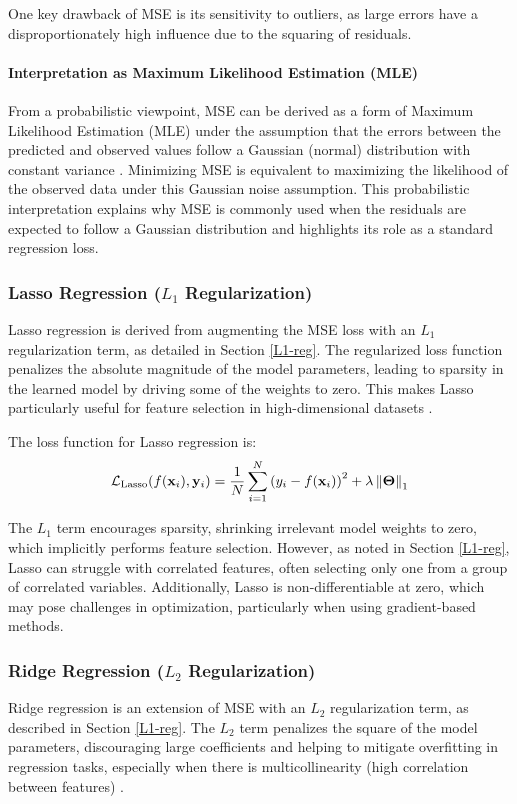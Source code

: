 \documentclass[sn-mathphys-num]{sn-jnl}%
\renewcommand\vec{\mathbf}
\begin{document}
    One key drawback of MSE is its sensitivity to outliers, as large errors have a disproportionately high influence due to the squaring of residuals.

    \paragraph{Interpretation as Maximum Likelihood Estimation (MLE)}
    From a probabilistic viewpoint, MSE can be derived as a form of Maximum Likelihood Estimation (MLE) under the assumption that the errors between the predicted and observed values follow a Gaussian (normal) distribution with constant variance \cite{ML_3,murphy2013machine}. Minimizing MSE is equivalent to maximizing the likelihood of the observed data under this Gaussian noise assumption. This probabilistic interpretation explains why MSE is commonly used when the residuals are expected to follow a Gaussian distribution and highlights its role as a standard regression loss.


    \subsubsection{Lasso Regression ($L_1$ Regularization)}\label{subsubsec-lasso_regression}
Lasso regression is derived from augmenting the MSE loss with an $L_1$ regularization term, as detailed in Section \ref{L1-reg}. The regularized loss function penalizes the absolute magnitude of the model parameters, leading to sparsity in the learned model by driving some of the weights to zero. This makes Lasso particularly useful for feature selection in high-dimensional datasets \cite{lasso_regression,ML_2}.

The loss function for Lasso regression is:
\begin{equation}\label{lasso_loss}
    \mathcal{L}_{\text{Lasso}}(f(\vec{x}_i),\vec{y}_i)  = \frac{1}{N} \sum_{i=1}^{N} \left ( y_i - f(\vec{x}_i) \right )^{2} + \lambda \norm{\vec{\Theta}}_1
\end{equation}

The $L_1$ term encourages sparsity, shrinking irrelevant model weights to zero, which implicitly performs feature selection. However, as noted in Section \ref{L1-reg}, Lasso can struggle with correlated features, often selecting only one from a group of correlated variables. Additionally, Lasso is non-differentiable at zero, which may pose challenges in optimization, particularly when using gradient-based methods.


    \subsubsection{Ridge Regression ($L_2$ Regularization)}\label{subsubsec-ridge_regression}
Ridge regression is an extension of MSE with an $L_2$ regularization term, as described in Section \ref{L1-reg}. The $L_2$ term penalizes the square of the model parameters, discouraging large coefficients and helping to mitigate overfitting in regression tasks, especially when there is multicollinearity (high correlation between features) \cite{ridge_regression}.
\end{document}

